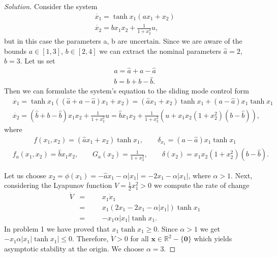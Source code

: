 \documentclass[12pt]{article}
\newenvironment{problem}[2][Problem]{\begin{trivlist}
\item[\hskip \labelsep {\bfseries #1}\hskip \labelsep {\bfseries #2.}]}{\end{trivlist}}
\newenvironment{solution}{\begin{proof}[Solution]}{\end{proof}}
\begin{document}

\begin{problem}{2} %

\end{problem}

\begin{solution}
Consider the system
\begin{align*}
&\dot{x_1}= \tanh x_1 (ax_1+x_2) \\
&\dot{x_2}=bx_1x_2+ \frac{1}{1+x_2^2}u,
\end{align*}
but in this case the parameters a, b are uncertain. Since we are aware of the bounds $a\in [1,3]$, $b\in [2,4]$ we can extract the nominal parameters $\hat{a}=2$, $\hat{b}=3$. Let us set
\begin{align*}
&a= \hat{a}+a-\hat{a} \\
&b= \hat{b}+b-\hat{b}.
\end{align*}
Then we can formulate the system's equation to the sliding mode control form
\begin{align*}
&\dot{x_1}= \tanh x_1 (( \hat{a}+a-\hat{a} )x_1+x_2)= (\hat{a}x_1+x_2) \tanh x_1 + (a-\hat{a})x_1 \tanh x_1\\
&\dot{x_2}= ( \hat{b}+b-\hat{b} )x_1x_2+ \frac{1}{1+x_2^2}u=\hat{b}x_1x_2+\frac{1}{1+x_2^2}(u+x_1x_2(1+x_2^2)(b-\hat{b})),
\end{align*}
where
\begin{align*}
&f(x_1,x_2)= (\hat{a}x_1+x_2)\tanh x_1, \qquad
\delta_{x_1}=(a-\hat{a})x_1\tanh x_1 
\end{align*}
\begin{align*}
&f_a(x_1,x_2)=\hat{b}x_1x_2, \qquad
G_a(x_2)=\frac{1}{1+x_2^2}, \qquad
\delta(x_2)=x_1x_2(1+x_2^2)(b-\hat{b}).
\end{align*}

Let us choose $x_2=\phi(x_1)=-\hat{a}x_1-\alpha |x_1|=-2x_1-\alpha |x_1|$, where $\alpha>1$. Next, considering the Lyapunov function $V=\frac{1}{2}x_1^2>0$ we compute the rate of change
\begin{equation*}
\begin{aligned}
& \dot{V}
& = 
&&& x_1\dot{x}_1\\
&&=
&&& x_1(2x_1-2x_1- \alpha |x_1|)  \tanh x_1 \\
&&=
&&& - x_1 \alpha |x_1|  \tanh x_1 .
\end{aligned}
\end{equation*}
In problem 1 we have proved that $x_1 \tanh x_1 \geq 0$. Since $\alpha>1$ we get  $- x_1 \alpha |x_1|  \tanh x_1| \leq 0$. Therefore, $\dot{V}>0$ for all $\textbf{x} \in \mathbb{R}^2 - \{ \textbf{0} \}$ which yields asymptotic stability at the origin. We choose $\alpha=3 $.


\end{solution}
\end{document}
